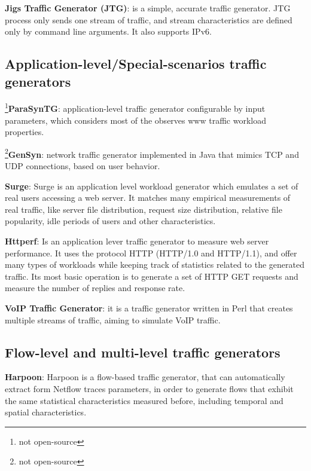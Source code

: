 \textbf{Jigs Traffic Generator (JTG)}\cite{web-jtg}: is a simple, accurate traffic generator. JTG process only sends one stream of traffic, and stream characteristics are defined only by command line arguments. It also supports IPv6.
 
\subsection{Application-level/Special-scenarios traffic generators}


\footnote{not open-source}\textbf{ParaSynTG}\cite{parasyntg-paper}: application-level traffic generator configurable by input parameters, which considers most of the observes www traffic workload properties. 


\footnote{not open-source}\textbf{GenSyn}\cite{web-gensyn}: network traffic generator implemented in Java that mimics TCP and UDP connections, based on user behavior. 

\textbf{Surge}\cite{surge-paper}:  Surge is an application level workload generator which emulates a set of real users accessing a web server. It matches many empirical measurements of real traffic, like server file distribution, request size distribution, relative file popularity, idle periods of users and other characteristics. 

\textbf{Httperf}\cite{web-httperf}: Is an application lever traffic generator to measure web server performance. It uses the protocol HTTP (HTTP/1.0 and HTTP/1.1), and offer many types of workloads while keeping track of statistics related to the generated traffic. 
Its most basic operation is to generate a set of HTTP GET requests and measure the number of replies and response rate. 

\textbf{VoIP Traffic Generator}:  it is a traffic generator written in Perl that creates multiple streams of traffic, aiming to simulate VoIP traffic.


\subsection{Flow-level and multi-level traffic generators}

\textbf{Harpoon}\cite{harpoon-paper}: Harpoon is a flow-based traffic generator, that can automatically extract form Netflow traces parameters, in order to generate flows that exhibit the same statistical characteristics measured before, including temporal and spatial characteristics. 

